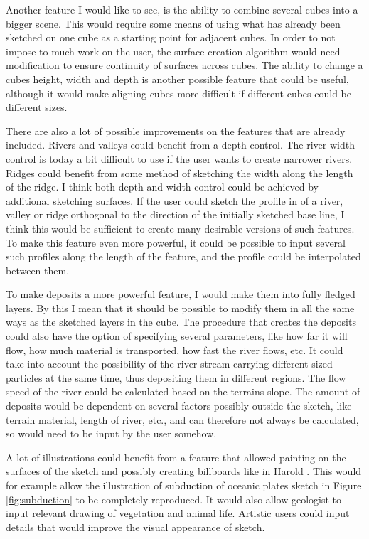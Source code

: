 \documentclass[a4paper,12pt]{report}
\begin{document}
Another feature I would like to see, is the ability to combine several cubes into a bigger scene. This would require some means of using what has already been sketched on one cube as a starting point for adjacent cubes. In order to not impose to much work on the user, the surface creation algorithm would need modification to ensure continuity of surfaces across cubes. The ability to change a cubes height, width and depth is another possible feature that could be useful, although it would make aligning cubes more difficult if different cubes could be different sizes.


There are also a lot of possible improvements on the features that are already included. Rivers and valleys could benefit from a depth control. The river width control is today a bit difficult to use if the user wants to create narrower rivers. Ridges could benefit from some method of sketching the width along the length of the ridge. I think both depth and width control could be achieved by additional sketching surfaces. If the user could sketch the profile in of a river, valley or ridge orthogonal to the direction of the initially sketched base line, I think this would be sufficient to create many desirable versions of such features. To make this feature even more powerful, it could be possible to input several such profiles along the length of the feature, and the profile could be interpolated between them.

To make deposits a more powerful feature, I would make them into fully fledged layers. By this I mean that it should be possible to modify them in all the same ways as the sketched layers in the cube. The procedure that creates the deposits could also have the option of specifying several parameters, like how far it will flow, how much material is transported, how fast the river flows, etc. It could take into account the possibility of the river stream carrying different sized particles at the same time, thus depositing them in different regions. The flow speed of the river could be calculated based on the terrains slope. The amount of deposits would be dependent on several factors possibly outside the sketch, like terrain material, length of river, etc., and can therefore not always be calculated, so would need to be input by the user somehow.

A lot of illustrations could benefit from a feature that allowed painting on the surfaces of the sketch and possibly creating billboards like in Harold \cite{cohen2000harold}. This would for example allow the illustration of subduction of oceanic plates sketch in Figure \ref{fig:subduction} to be completely reproduced. It would also allow geologist to input relevant drawing of vegetation and animal life. Artistic users could input details that would improve the visual appearance of sketch.
\end{document}
